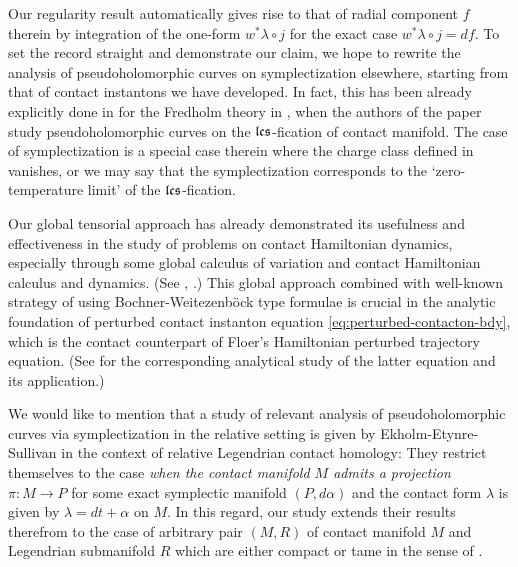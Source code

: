 \documentclass[reqno]{amsart}
\theoremstyle{theorem}
\theoremstyle{definition}
\numberwithin{equation}{section}
\begin{document}
Our regularity result automatically gives
rise to that of radial component $f$ therein by integration of the one-form $w^*\lambda \circ j$
for the exact case $w^*\lambda \circ j = df$. To set the record straight and demonstrate
our claim, we hope to rewrite the analysis of pseudoholomorphic curves on
symplectization elsewhere, starting from that of contact instantons we have developed.
In fact, this has been already explicitly done in \cite{oh-savelyev} for the
Fredholm theory in \cite[Theorem 1.15]{oh-savelyev}, when the authors of the paper study
pseudoholomorphic curves on the $\frak{lcs}$-fication of contact manifold. The case of symplectization
is a special case therein where the charge class  defined in \cite{oh-savelyev}
vanishes, or we may say that the symplectization corresponds to the
`zero-temperature limit' of the $\frak{lcs}$-fication.

Our global tensorial approach has already demonstrated its usefulness and effectiveness
in the study of problems on contact Hamiltonian dynamics, especially through
some global calculus of variation and contact Hamiltonian calculus and dynamics.
(See \cite{oh:entanglement1}, \cite{oh:shelukhin-conjecture}.)
This global approach combined with well-known strategy of using
Bochner-Weitezenb\"ock type formulae is crucial in the analytic foundation of
perturbed contact instanton equation \eqref{eq:perturbed-contacton-bdy}, which is
the contact counterpart of Floer's Hamiltonian perturbed trajectory equation.
(See \cite{salamon-zehnder} for the corresponding analytical study of
the latter equation and its application.)

We would like to mention that
a study of relevant analysis of pseudoholomorphic curves  via symplectization
in the relative setting is given by Ekholm-Etynre-Sullivan \cite{EES-jdg,EES-tams} in the
context of relative Legendrian contact homology:
They restrict themselves to the case \emph{when the contact manifold $M$
admits a projection} $\pi: M \to P$ for some exact symplectic manifold $(P,d\alpha)$
and the contact form $\lambda$ is given by $\lambda = dt + \alpha$ on $M$.
In this regard, our study extends their results therefrom to the case of arbitrary pair
$(M,R)$ of contact manifold $M$ and  Legendrian submanifold $R$ which are either
compact or tame in the sense of \cite{oh:entanglement1}.

\medskip
\end{document}
